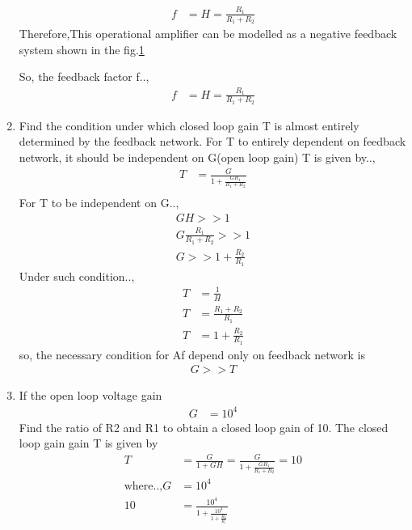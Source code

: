 \begin{enumerate}[label=\thesubsection.\arabic*.,ref=\thesubsection.\theenumi]
\begin{align}
    f &= H = \frac{R_1}{R_1+R_2}
\end{align}
Therefore,This operational amplifier can be modelled as a negative feedback system shown in the fig.\ref{fig:equivalent_control_system}
\begin{figure}[!ht]
	\begin{center}
			\resizebox{\columnwidth}{!}{}
	\end{center}
\caption{}
\label{fig:equivalent_control_system}
\end{figure}
So, the feedback factor f..,
\begin{align}
     f &= H = \frac{R_1}{R_1+R_2}
\end{align}
\item Find the condition under which closed loop gain T is almost entirely determined by the feedback network.
\solution For T to entirely dependent on feedback network, it should be independent on G(open loop gain)
T is given by..,
\begin{align}
    T &= \frac{G}{1+\frac{GR_1}{R_1+R_2}} \\
\end{align}
For T to be independent on G..,
\begin{align}
 GH >> 1 \\
 G\frac{R_1}{R_1+R_2} >> 1 \\
 G >> 1 + \frac{R_2}{R_1} 
\end{align}
Under such condition..,
\begin{align}
    T &= \frac{1}{H} \\
    T &= \frac{R_1+R_2}{R_1}\\
    T &= 1+\frac{R_2}{R_1}
\end{align}
so, the necessary condition for Af depend only on feedback network is
\begin{align}
    G >> T
\end{align}
\item If the open loop voltage gain
\begin{align} 
G & = 10^4
\end{align}
Find the ratio of R2 and R1 to obtain a closed loop gain of 10.
\solution The closed loop gain gain T is given by
\begin{align}
    T &= \frac{G}{1+GH}
        = \frac{G}{1+\frac{GR_1}{R_1+R_2}} = 10\\
    \text{where..,} G &= 10^4 \\
    10 &= \frac{10^4}{1+\frac{10^4}{1+\frac{R_2}{R_1}}}\\

\end{align}
\end{enumerate}
